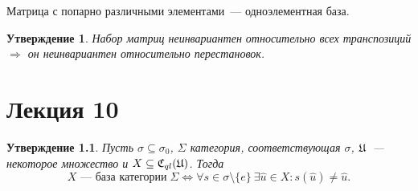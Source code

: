 \documentclass[a4paper, 12pt]{report}
\newtheorem{St}{Утверждение}[chapter]
\begin{document}
Матрица с попарно различными элементами~--- одноэлементная база.

\begin{St}
Набор матриц неинвариантен относительно всех транспозиций $\Rightarrow$ он неинвариантен относительно перестановок. 
\end{St}


\chapter{Лекция 10}
\begin{St}
Пусть $\sigma \subseteq \sigma_0$, $\Sigma$ категория, соответствующая $\sigma$, $\mathfrak{U}$~--- некоторое множество и $X \subseteq \mathfrak{C}_{ql}(\mathfrak{U})$. Тогда
\[
X\text{~--- база категории} \; \Sigma \Leftrightarrow \forall s \in \sigma \setminus \{e\} \ \exists \hat{u} \in X: s(\hat{u}) \neq \hat{u}.
\]
\end{St}
\end{document}
